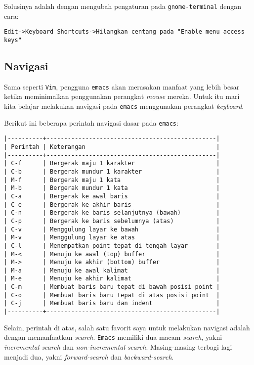 \documentclass{article}
\begin{document}
Solusinya adalah dengan mengubah pengaturan pada 
\verb=gnome-terminal= dengan cara:

\begin{verbatim}
Edit->Keyboard Shortcuts->Hilangkan centang pada "Enable menu access keys"
\end{verbatim}

\subsection{Navigasi}

Sama seperti \verb=Vim=, pengguna \verb=emacs= akan
merasakan manfaat yang lebih besar ketika meminimalkan
penggunakan perangkat \emph{mouse} mereka. Untuk itu mari kita
belajar melakukan navigasi pada \verb=emacs= menggunakan
perangkat \emph{keyboard}.

Berikut ini beberapa perintah navigasi dasar pada \verb=emacs=:

\begin{verbatim}
|----------+------------------------------------------------|
| Perintah | Keterangan                                     |
|----------+------------------------------------------------|
| C-f      | Bergerak maju 1 karakter                       |
| C-b      | Bergerak mundur 1 karakter                     |
| M-f      | Bergerak maju 1 kata                           |
| M-b      | Bergerak mundur 1 kata                         |
| C-a      | Bergerak ke awal baris                         |
| C-e      | Bergerak ke akhir baris                        |
| C-n      | Bergerak ke baris selanjutnya (bawah)          |
| C-p      | Bergerak ke baris sebelumnya (atas)            |
| C-v      | Menggulung layar ke bawah                      |
| M-v      | Menggulung layar ke atas                       |
| C-l      | Menempatkan point tepat di tengah layar        |
| M-<      | Menuju ke awal (top) buffer                    |
| M->      | Menuju ke akhir (bottom) buffer                |
| M-a      | Menuju ke awal kalimat                         |
| M-e      | Menuju ke akhir kalimat                        |
| C-m      | Membuat baris baru tepat di bawah posisi point |
| C-o      | Membuat baris baru tepat di atas posisi point  |
| C-j      | Membuat baris baru dan indent                  |
|----------+------------------------------------------------|
\end{verbatim}

Selain, perintah di atas, salah satu favorit saya untuk melakukan navigasi 
adalah dengan memanfaatkan \emph{search}. \verb=Emacs= memiliki dua 
macam \emph{search}, yakni \emph{incremental search} dan 
\emph{non-incremental search}. Masing-masing terbagi lagi
menjadi dua, yakni \emph{forward-search} dan \emph{backward-search}.
\end{document}
